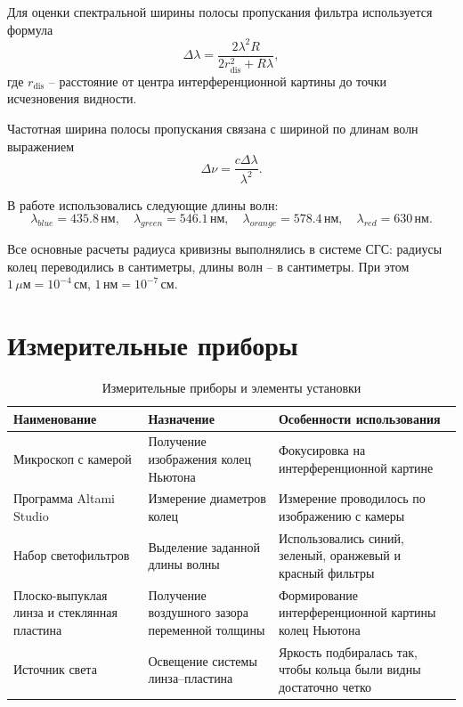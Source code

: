 \documentclass[12pt,a4paper]{article}
\newcommand{\um}{\ensuremath{\,\mu\text{м}}}
\newcommand{\nm}{\ensuremath{\,\text{нм}}}
\newcommand{\cm}{\ensuremath{\,\text{см}}}
\begin{document}
Для оценки спектральной ширины полосы пропускания фильтра используется формула
\begin{equation}
    \Delta \lambda = \frac{2\lambda^2 R}{2r_{\text{dis}}^2 + R\lambda},
\end{equation}
где $r_{\text{dis}}$ -- расстояние от центра интерференционной картины до точки исчезновения видности.

Частотная ширина полосы пропускания связана с шириной по длинам волн выражением
\begin{equation}
    \Delta \nu = \frac{c\Delta\lambda}{\lambda^2}.
\end{equation}

В работе использовались следующие длины волн:
\begin{equation}
    \lambda_{blue}=435.8\nm,\quad
    \lambda_{green}=546.1\nm,\quad
    \lambda_{orange}=578.4\nm,\quad
    \lambda_{red}=630\nm.
\end{equation}

Все основные расчеты радиуса кривизны выполнялись в системе СГС: радиусы колец переводились в сантиметры, длины волн -- в сантиметры. При этом $1\um = 10^{-4}\cm$, $1\nm = 10^{-7}\cm$.

\section{Измерительные приборы}

\begin{table}[H]
\centering
\caption{Измерительные приборы и элементы установки}
\begin{tabularx}{\textwidth}{>{\raggedright\arraybackslash}X>{\raggedright\arraybackslash}X>{\raggedright\arraybackslash}X}
\toprule
Наименование & Назначение & Особенности использования \\
\midrule
Микроскоп с камерой & Получение изображения колец Ньютона & Фокусировка на интерференционной картине \\
Программа Altami Studio & Измерение диаметров колец & Измерение проводилось по изображению с камеры \\
Набор светофильтров & Выделение заданной длины волны & Использовались синий, зеленый, оранжевый и красный фильтры \\
Плоско-выпуклая линза и стеклянная пластина & Получение воздушного зазора переменной толщины & Формирование интерференционной картины колец Ньютона \\
Источник света & Освещение системы линза--пластина & Яркость подбиралась так, чтобы кольца были видны достаточно четко \\
\bottomrule
\end{tabularx}
\end{table}
\end{document}
